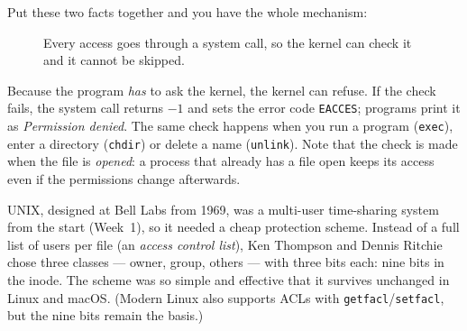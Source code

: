 \documentclass[11pt,a4paper]{article}
\newcommand{\cmd}[1]{\texttt{#1}}
\begin{document}
Put these two facts together and you have the whole mechanism:

\begin{figure}[H]
\centering
{}
\caption{Every access goes through a system call, so the kernel can check it and it cannot be skipped.}
\end{figure}

Because the program \emph{has} to ask the kernel, the kernel can refuse. If the check fails, the system call returns $-1$ and sets the error code \texttt{EACCES}; programs print it as \emph{Permission denied}. The same check happens when you run a program (\cmd{exec}), enter a directory (\cmd{chdir}) or delete a name (\cmd{unlink}). Note that the check is made when the file is \emph{opened}: a process that already has a file open keeps its access even if the permissions change afterwards.


\begin{histnote}
UNIX, designed at Bell Labs from 1969, was a multi-user time-sharing system from the start (Week~1), so it needed a cheap protection scheme. Instead of a full list of users per file (an \emph{access control list}), Ken Thompson and Dennis Ritchie chose three classes --- owner, group, others --- with three bits each: nine bits in the inode. The scheme was so simple and effective that it survives unchanged in Linux and macOS. (Modern Linux also supports ACLs with \cmd{getfacl}/\cmd{setfacl}, but the nine bits remain the basis.)
\end{histnote}
\end{document}
